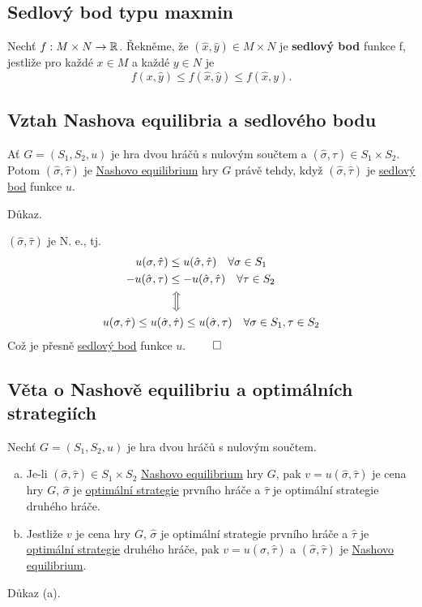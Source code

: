 \subsection{Sedlový bod typu maxmin}\label{sedlmax}
Nechť $f: M \times N \rightarrow \mathbb{R}$. Řekněme, že $(\hat x, \hat y) \in M \times N$ je \textbf{sedlový bod} funkce f, 
jestliže pro každé $x \in M$ a každé $y \in N$ je 
\[ 
    f(x, \hat y) \leq f(\hat x, \hat y) \leq f(\hat x, y).
\]
\newpage
\subsection{Vztah Nashova equilibria a sedlového bodu}\label{sedl}
Ať $G = (S_1, S_2, u)$ je hra dvou hráčů s nulovým součtem a $(\hat \sigma, \hat \tau) \in S_1 \times S_2$. Potom 
$(\hat \sigma, \hat \tau)$ je \hyperref[nash]{Nashovo equilibrium} hry $G$ právě tehdy, když $(\hat \sigma, \hat \tau)$
je \hyperref[sedlmax]{sedlový bod} funkce $u$.

Důkaz.

$(\hat \sigma, \hat \tau)$ je N. e., tj. 
\begin{align*}
    u(\sigma, \hat \tau) &\leq u(\hat \sigma, \hat \tau) \quad \forall \sigma \in S_1 \\
    -u(\hat \sigma, \tau) &\leq -u(\hat \sigma, \hat \tau) \quad \forall \tau \in S_2 \\
    &\,\, \Big\Updownarrow \\
    u(\sigma, \hat \tau) \leq u (\hat \sigma&, \hat \tau) \leq u(\hat \sigma, \tau) \quad \forall \sigma \in S_1, 
    \tau \in S_2
\end{align*}
Což je přesně \hyperref[sedlmax]{sedlový bod} funkce $u$. $\qed$

\subsection{Věta o Nashově equilibriu a optimálních strategiích}
Nechť $G = (S_1, S_2, u)$ je hra dvou hráčů s nulovým součtem.
\begin{enumerate}[(a)]
    \item Je-li $(\hat \sigma, \hat \tau) \in S_1 \times S_2$ \hyperref[nash]{Nashovo equilibrium} hry $G$, pak 
    $v = u(\hat \sigma, \hat \tau)$ je cena hry $G$, $\hat \sigma$ je \hyperref[optimalStrat]{optimální strategie} 
    prvního hráče a $\hat \tau$ je optimální strategie druhého hráče.
    \item Jestliže $v$ je cena hry $G$, $\hat \sigma$ je optimální strategie prvního hráče a $\hat \tau$ je 
    \hyperref[optimalStrat]{optimální strategie} druhého hráče, pak 
    $v = u(\hat \sigma, \hat \tau)$ a $(\hat \sigma, \hat \tau)$ je \hyperref[nash]{Nashovo equilibrium}.
\end{enumerate}
Důkaz (a).

